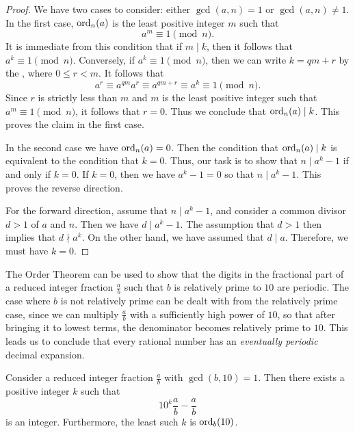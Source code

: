 \begin{proof}
  We have two cases to consider: either $\gcd(a,n)=1$ or $\gcd(a,n)\neq 1$. In the first case, $\operatorname{ord}_n(a)$ is the least positive integer $m$ such that
  \begin{equation*}
    a^m\equiv 1 \pmod{n}.
  \end{equation*}
  It is immediate from this condition that if $m\mid k$, then it follows that $a^k\equiv 1\pmod{n}$. Conversely, if $a^k\equiv 1\pmod{n}$, then we can write $k=qm+r$ by the , where $0\leq r<m$. It follows that
  \begin{equation*}
    a^r \equiv a^{qm}a^r \equiv a^{qm+r} \equiv a^k \equiv 1\pmod{n}. 
  \end{equation*}
  Since $r$ is strictly less than $m$ and $m$ is the least positive integer such that $a^m\equiv 1\pmod{n}$, it follows that $r=0$. Thus we conclude that $\operatorname{ord}_n(a)\mid k$. This proves the claim in the first case.

  In the second case we have $\operatorname{ord}_n(a)=0$. Then the condition that $\operatorname{ord}_n(a)\mid k$ is equivalent to the condition that $k=0$. Thus, our task is to show that $n\mid a^k-1$ if and only if $k=0$. If $k=0$, then we have $a^k-1=0$ so that $n\mid a^k-1$. This proves the reverse direction.

  For the forward direction, assume that $n\mid a^k-1$, and consider a common divisor $d>1$ of $a$ and $n$. Then we have $d\mid a^k-1$. The assumption that $d>1$ then implies that $d\nmid a^k$. On the other hand, we have assumed that $d\mid a$. Therefore, we must have $k=0$.
\end{proof}

The Order Theorem can be used to show that the digits in the fractional part of a reduced integer fraction $\frac{a}{b}$ such that $b$ is relatively prime to $10$ are periodic. The case where $b$ is not relatively prime can be dealt with from the relatively prime case, since we can multiply $\frac{a}{b}$ with a sufficiently high power of $10$, so that after bringing it to lowest terms, the denominator becomes relatively prime to $10$. This leads us to conclude that every rational number has an \emph{eventually periodic} decimal expansion.

\begin{theorem}
  Consider a reduced integer fraction $\frac{a}{b}$ with $\gcd(b,10)=1$. Then there exists a positive integer $k$ such that
  \begin{equation*}
    10^k\frac{a}{b}-\frac{a}{b}
  \end{equation*}
  is an integer. Furthermore, the least such $k$ is $\operatorname{ord}_b(10)$.
\end{theorem}

